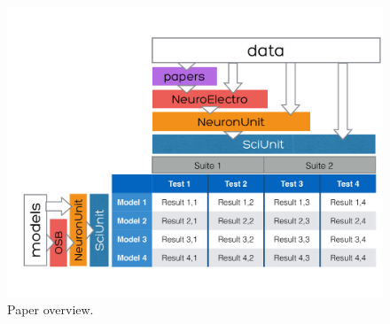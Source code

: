 \documentclass[11pt,letterpaper]{article}
\begin{document}
\begin{figure}
\vspace{-38px}
\includegraphics[scale=0.5]{diagram1.pdf}
\vspace{-25px}
\caption{Paper overview.}
\label{fig:sciunit_overview}
\end{figure}
\leavevmode
\vspace{-0px}
\end{document}

